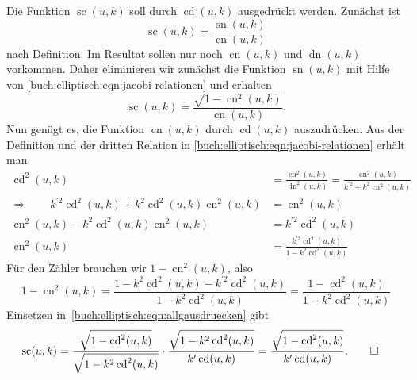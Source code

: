 \begin{beispiel}
Die Funktion $\operatorname{sc}(u,k)$ soll durch $\operatorname{cd}(u,k)$
ausgedrückt werden.
Zunächst ist 
\[
\operatorname{sc}(u,k)
=
\frac{\operatorname{sn}(u,k)}{\operatorname{cn}(u,k)}
\]
nach Definition.
Im Resultat sollen nur noch $\operatorname{cn}(u,k)$ und
$\operatorname{dn}(u,k)$ vorkommen.
Daher eliminieren wir zunächst die Funktion $\operatorname{sn}(u,k)$
mit Hilfe von \eqref{buch:elliptisch:eqn:jacobi-relationen} und erhalten
\begin{equation}
\operatorname{sc}(u,k)
=
\frac{\sqrt{1-\operatorname{cn}^2(u,k)}}{\operatorname{cn}(u,k)}.
\label{buch:elliptisch:eqn:allgausdruecken}
\end{equation}
Nun genügt es, die Funktion $\operatorname{cn}(u,k)$ durch
$\operatorname{cd}(u,k)$ auszudrücken.
Aus der Definition und der
dritten Relation in \eqref{buch:elliptisch:eqn:jacobi-relationen} 
erhält man
\begin{align*}
\operatorname{cd}^2(u,k)
&=
\frac{\operatorname{cn}^2(u,k)}{\operatorname{dn}^2(u,k)}
=
\frac{\operatorname{cn}^2(u,k)}{k^{\prime2}+k^2\operatorname{cn}^2(u,k)}
\\
\Rightarrow
\qquad
k^{\prime 2}
\operatorname{cd}^2(u,k)
+
k^2\operatorname{cd}^2(u,k)\operatorname{cn}^2(u,k)
&=
\operatorname{cn}^2(u,k)
\\
\operatorname{cn}^2(u,k)
-
k^2\operatorname{cd}^2(u,k)\operatorname{cn}^2(u,k)
&=
k^{\prime 2}
\operatorname{cd}^2(u,k)
\\
\operatorname{cn}^2(u,k)
&=
\frac{
k^{\prime 2}
\operatorname{cd}^2(u,k)
}{
1 - k^2\operatorname{cd}^2(u,k)
}
\end{align*}
Für den Zähler brauchen wir $1-\operatorname{cn}^2(u,k)$, also
\[
1-\operatorname{cn}^2(u,k)
=
\frac{
1
-
k^2\operatorname{cd}^2(u,k)
-
k^{\prime 2}
\operatorname{cd}^2(u,k)
}{
1
-
k^2\operatorname{cd}^2(u,k)
}
=
\frac{1-\operatorname{cd}^2(u,k)}{1-k^2\operatorname{cd}^2(u,k)}
\]
Einsetzen in~\eqref{buch:elliptisch:eqn:allgausdruecken} gibt
\begin{align*}
\operatorname{sc}(u,k)
&=
\frac{
\sqrt{1-\operatorname{cd}^2(u,k)}
}{\sqrt{1-k^2\operatorname{cd}^2(u,k)}}
\cdot
\frac{
\sqrt{1 - k^2\operatorname{cd}^2(u,k)}
}{
k'
\operatorname{cd}(u,k)
}
=
\frac{
\sqrt{1-\operatorname{cd}^2(u,k)}
}{
k'
\operatorname{cd}(u,k)
}.
\qedhere
\end{align*}
\end{beispiel}

